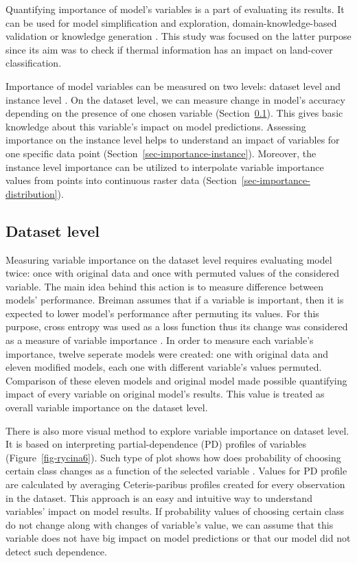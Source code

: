 \documentclass{amuthesis}
\begin{document}
Quantifying importance of model's variables is a part of evaluating its
results. It can be used for model simplification and exploration,
domain-knowledge-based validation or knowledge generation
\autocite{biecek_explanatory_2021}. This study was focused on the latter
purpose since its aim was to check if thermal information has an impact
on land-cover classification.

Importance of model variables can be measured on two levels: dataset
level and instance level \autocite{biecek_explanatory_2021}. On the
dataset level, we can measure change in model's accuracy depending on
the presence of one chosen variable
(Section~\ref{sec-importance-dataset}). This gives basic knowledge about
this variable's impact on model predictions. Assessing importance on the
instance level helps to understand an impact of variables for one
specific data point (Section~\ref{sec-importance-instance}). Moreover,
the instance level importance can be utilized to interpolate variable
importance values from points into continuous raster data
(Section~\ref{sec-importance-distribution}).

\hypertarget{sec-importance-dataset}{%
\subsection{Dataset level}\label{sec-importance-dataset}}

Measuring variable importance on the dataset level requires evaluating
model twice: once with original data and once with permuted values of
the considered variable. The main idea behind this action is to measure
difference between models' performance. Breiman
\autocite*{breiman_random_2001} assumes that if a variable is important,
then it is expected to lower model's performance after permuting its
values. For this purpose, cross entropy was used as a loss function thus
its change was considered as a measure of variable importance
\autocite{biecek_explanatory_2021}. In order to measure each variable's
importance, twelve seperate models were created: one with original data
and eleven modified models, each one with different variable's values
permuted. Comparison of these eleven models and original model made
possible quantifying impact of every variable on original model's
results. This value is treated as overall variable importance on the
dataset level.

There is also more visual method to explore variable importance on
dataset level. It is based on interpreting partial-dependence (PD)
profiles of variables (Figure~\ref{fig-rycina6}). Such type of plot
shows how does probability of choosing certain class changes as a
function of the selected variable \autocite{biecek_explanatory_2021}.
Values for PD profile are calculated by averaging Ceteris-paribus
profiles created for every observation in the dataset. This approach is
an easy and intuitive way to understand variables' impact on model
results. If probability values of choosing certain class do not change
along with changes of variable's value, we can assume that this variable
does not have big impact on model predictions or that our model did not
detect such dependence.
\end{document}
